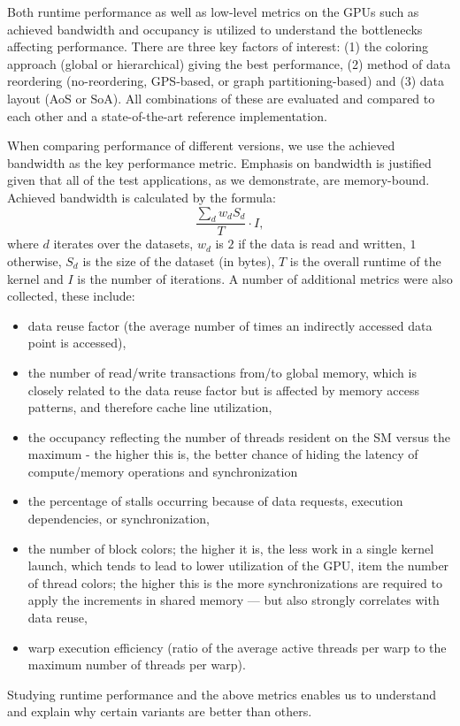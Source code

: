 Both runtime performance as well as low-level metrics on the GPUs such as 
achieved bandwidth and occupancy is utilized to understand the bottlenecks 
affecting performance. There are three key factors of interest: (1) 
the coloring approach (global or hierarchical) giving the best performance, 
(2) method of data reordering (no-reordering, GPS-based, or graph 
partitioning-based) and (3) data layout (AoS or SoA). All combinations of these 
are evaluated and compared to each other and a state-of-the-art reference 
implementation.

When comparing performance of different versions, we use the achieved bandwidth
as the key performance metric. Emphasis on bandwidth is justified given that 
all of the test applications, as we demonstrate, are memory-bound. Achieved 
bandwidth is calculated by the formula: $$\frac{\sum_{d} w_dS_d}{T} \cdot I,$$ 
where $d$ iterates over the datasets, $w_d$ is $2$ if the data is read and 
written, $1$ otherwise, $S_d$ is the size of the dataset (in bytes), $T$ is the 
overall runtime of the kernel and $I$ is the number of iterations. A number 
of additional metrics were also collected, these include:
\begin{itemize}
\item data reuse factor (the average number of times an indirectly accessed
data point is accessed),
\item the number of read/write transactions from/to global memory, which is
closely related to the data reuse factor but is affected by memory access
patterns, and therefore cache line utilization,
\item the occupancy reflecting the number of threads resident on the SM versus
the maximum - the higher this is, the better chance of hiding the latency of
compute/memory operations and synchronization
\item the percentage of stalls occurring because of data requests, execution
dependencies, or synchronization,
\item the number of block colors; the higher it is, the less work in a
single kernel launch, which tends to lead to lower utilization of the GPU,
item the number of thread colors; the higher this is the more
synchronizations are required to apply the increments in shared memory ---
but also strongly correlates with data reuse,
\item warp execution efficiency (ratio of the average active threads per warp
to the maximum number of threads per warp).
\end{itemize}
Studying runtime performance and the above metrics enables us to understand 
and explain why certain variants are better than others.


